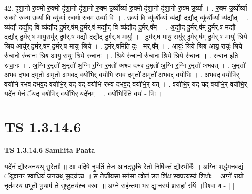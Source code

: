 \documentclass[17pt]{extarticle}
\begin{document}
42. दृ॒शा॒नो रु॒क्मो रु॒क्मो दृ॑शा॒नो दृ॑शा॒नो रु॒क्म उ॒र्व्योर्व्या रु॒क्मो दृ॑शा॒नो दृ॑शा॒नो रु॒क्म उ॒र्व्या । . रु॒क्म उ॒र्व्योर्व्या रु॒क्मो रु॒क्म उ॒र्व्या वि व्यु॑र्व्या रु॒क्मो रु॒क्म उ॒र्व्या वि । . उ॒र्व्या वि व्यु॑र्व्योर्व्या व्य॑द्यौ दद्यौ॒द् व्यु॑र्व्योर्व्या व्य॑द्यौत् । . व्य॑द्यौ दद्यौ॒द् वि व्य॑द्यौद् दु॒र्मर्.ष॑म् दु॒र्मर्.ष॑ मद्यौ॒द् वि व्य॑द्यौद् दु॒र्मर्.ष᳚म् । . अ॒द्यौ॒द् दु॒र्मर्.ष॑म् दु॒र्मर्.ष॑ मद्यौ दद्यौद् दु॒र्मर्.ष॒ मायु॒रायु॑र् दु॒र्मर्.ष॑ मद्यौ दद्यौद् दु॒र्मर्.ष॒ मायुः॑ । . दु॒र्मर्.ष॒ मायु॒ रायु॑र् दु॒र्मर्.ष॑म् दु॒र्मर्.ष॒ मायुः॑ श्रि॒ये श्रि॒य आयु॑र् दु॒र्मर्.ष॑म् दु॒र्मर्.ष॒ मायुः॑ श्रि॒ये । . दु॒र्मर्.ष॒मिति॑ दुः - मर्.ष᳚म् । . आयुः॑ श्रि॒ये श्रि॒य आयु॒ रायुः॑ श्रि॒ये रु॑चा॒नो रु॑चा॒नः श्रि॒य आयु॒ रायुः॑ श्रि॒ये रु॑चा॒नः । . श्रि॒ये रु॑चा॒नो रु॑चा॒नः श्रि॒ये श्रि॒ये रु॑चा॒नः । . रु॒चा॒न इति॑ रुचा॒नः । . अ॒ग्नि र॒मृतो॑ अ॒मृतो॑ अ॒ग्नि र॒ग्नि र॒मृतो॑ अभव दभव द॒मृतो॑ अ॒ग्नि र॒ग्नि र॒मृतो॑ अभवत् । . अ॒मृतो॑ अभव दभव द॒मृतो॑ अ॒मृतो॑ अभव॒द् वयो॑भि॒र् वयो॑भि रभव द॒मृतो॑ अ॒मृतो॑ अभव॒द् वयो॑भिः । . अ॒भ॒व॒द् वयो॑भि॒र् वयो॑भि रभव दभव॒द् वयो॑भि॒र् यद् यद् वयो॑भि रभव दभव॒द् वयो॑भि॒र् यत् । . वयो॑भि॒र् यद् यद् वयो॑भि॒र् वयो॑भि॒र् यदे॑न मेनं॒ ॅयद् वयो॑भि॒र् वयो॑भि॒र् यदे॑नम् । . वयो॑भि॒रिति॒ वयः॑ - भिः॒ । \newline
\pagebreak
{}
\section*{ TS 1.3.14.6 }

\textbf{TS 1.3.14.6 } \newline
\textbf{Samhita Paata} \newline

यदे॑नं॒ द्यौरज॑नयथ् सु॒रेताः᳚ ॥ आ यदि॒षे नृ॒पतिं॒ तेज॒ आन॒ट्छुचि॒ रेतो॒ निषि॑क्तं॒ द्यौर॒भीके᳚ । अ॒ग्निः शर्द्ध॑मनव॒द्यं ॅयुवा॑नꣳ स्वा॒धियं॑ जनयथ् सू॒दय॑च्च ॥ स तेजी॑यसा॒ मन॑सा॒ त्वोत॑ उ॒त शि॑क्ष स्वप॒त्यस्य॑ शि॒क्षोः । अग्ने॑ रा॒यो नृत॑मस्य॒ प्रभू॑तौ भू॒याम॑ ते सुष्टु॒तय॑श्च॒ वस्वः॑ ॥ अग्ने॒ सह॑न्त॒मा भ॑र द्यु॒म्नस्य॑ प्रा॒सहा॑ र॒यिं ।विश्वा॒ य - [ ] \newline
\end{document}
